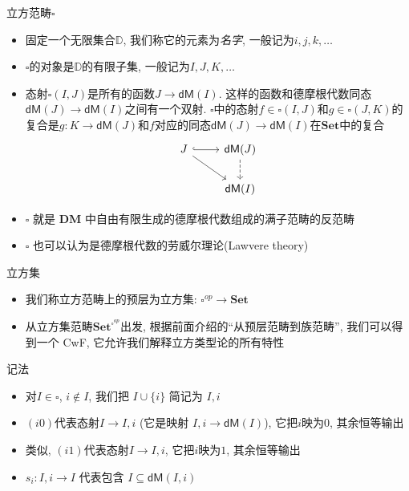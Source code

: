\documentclass[aspectratio=169,xcolor=dvipsnames]{beamer}
\newcommand\bbD{\mathbb{D}}
\newcommand\dM{\mathsf{dM}}
\newcommand\Set{\mathbf{Set}}
\newcommand\DM{\mathbf{DM}}
\begin{document}
\begin{frame}{立方范畴$\square$}
  \begin{itemize}
    \item 固定一个无限集合$\bbD$, 我们称它的元素为\emph{名字}, 一般记为$i,j,k,\ldots$
    \item $\square$的对象是$\bbD$的有限子集, 一般记为$I,J,K,\ldots$
    \item 态射$\square(I,J)$是所有的函数$J\to\dM(I)$. 这样的函数和德摩根代数同态$\dM(J)\to\dM(I)$之间有一个双射. $\square$中的态射$f\in\square(I,J)$和$g\in\square(J,K)$的复合是$g:K\to\dM(J)$和$f$对应的同态$\dM(J)\to\dM(I)$在$\Set$中的复合
    \[
  \begin{tikzcd}
  J \arrow[r,hook] \arrow[dr] & \dM(J) \arrow[d,dashed]\\
  & \dM(I)
  \end{tikzcd} \]
  \item $\square$ 就是 $\DM$ 中自由有限生成的德摩根代数组成的满子范畴的反范畴
  \item $\square$ 也可以认为是德摩根代数的劳威尔理论(Lawvere theory)
  \end{itemize}
\end{frame}

\begin{frame}{立方集}
  \begin{itemize}
    \item 我们称立方范畴上的预层为立方集: $\square^{op} \to \Set$
    \item 从立方集范畴$\Set^{\square^{op}}$出发, 根据前面介绍的“从预层范畴到族范畴”, 我们可以得到一个 CwF, 它允许我们解释立方类型论的所有特性
  \end{itemize}
\end{frame}

\begin{frame}{记法}
  \begin{itemize}
    \item 对$I\in\square$, $i\notin I$, 我们把 $I\cup \{i\}$ 简记为 $I,i$
    \item $(i0)$代表态射$I\to I,i$ (它是映射 $I,i\to\dM(I)$), 它把$i$映为$0$, 其余恒等输出
    \item 类似, $(i1)$代表态射$I\to I,i$, 它把$i$映为$1$, 其余恒等输出
    \item $s_i:I,i\to I$ 代表包含 $I\subseteq\dM(I,i)$
  \end{itemize}
\end{frame}
\end{document}

